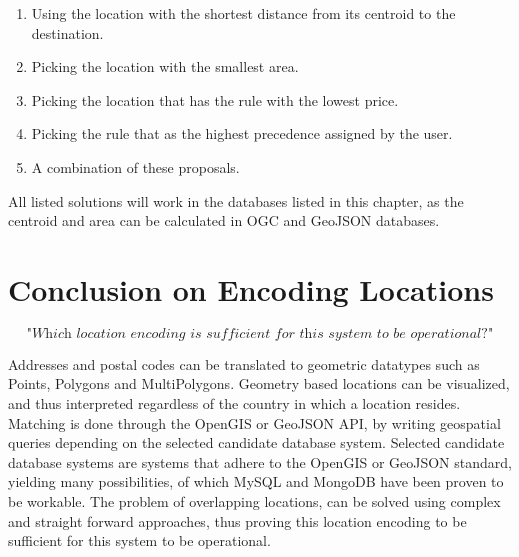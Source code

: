 \begin{enumerate}
	\item Using the location with the shortest distance from its centroid to the destination.
	\item Picking the location with the smallest area.
	\item Picking the location that has the rule with the lowest price.
	\item Picking the rule that as the highest precedence assigned by the user.
	\item A combination of these proposals.
\end{enumerate}

All listed solutions will work in the databases listed in this chapter, as the centroid and area can be calculated in OGC and GeoJSON databases.

%
\section{Conclusion on Encoding Locations}
\[\textit{"Which location encoding is sufficient for this system to be operational?"}\] \hfill

Addresses and postal codes can be translated to geometric datatypes such as Points, Polygons and MultiPolygons. Geometry based locations can be visualized, and thus interpreted regardless of the country in which a location resides. Matching is done through the OpenGIS or GeoJSON API, by writing geospatial queries depending on the selected candidate database system. Selected candidate database systems are systems that adhere to the OpenGIS or GeoJSON standard, yielding many possibilities, of which MySQL and MongoDB have been proven to be workable. The problem of overlapping locations, can be solved using complex and straight forward approaches, thus proving this location encoding to be sufficient for this system to be operational.